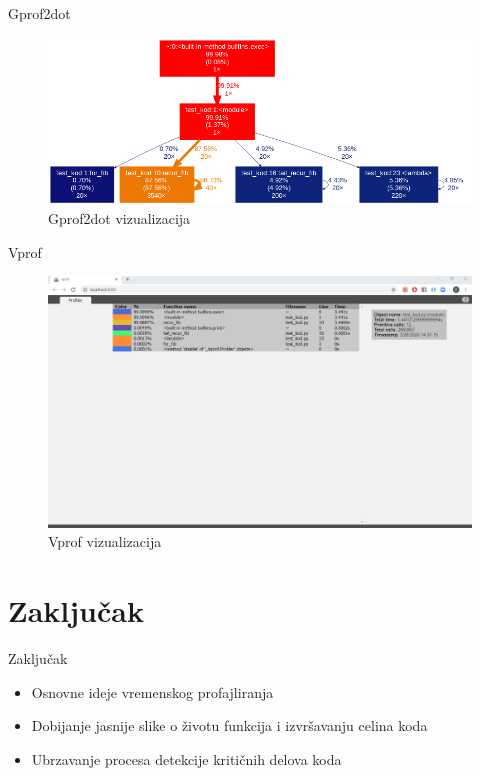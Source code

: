 \documentclass{beamer}
\begin{document}
\begin{frame}{Gprof2dot}
\begin{figure}[h!]
\begin{center}
\includegraphics[scale=0.37]{gprof2dot.png}
\end{center}
\caption{Gprof2dot vizualizacija}
\label{fig:gprof2dot_1}
\end{figure}
\end{frame}

\begin{frame}{Vprof}
\begin{figure}[h!]
\begin{center}
\includegraphics[trim={0cm 20cm 0cm 0cm},clip,scale=0.21]{vprof.png}
\end{center}
\caption{Vprof vizualizacija}
\label{fig:vprof_1}
\end{figure}
\end{frame}

\section{Zaključak}
\begin{frame}{Zaključak}
\begin{itemize}
    \item Osnovne ideje vremenskog profajliranja
    \item Dobijanje jasnije slike o životu funkcija i izvršavanju celina koda
    \item Ubrzavanje procesa detekcije kritičnih delova koda
\end{itemize}
\end{frame}
\end{document}
